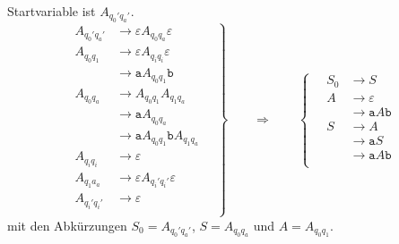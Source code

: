 \begin{loesung}
Startvariable ist $A_{q_0'q_a'}$.
\[
\left.
\begin{aligned}
A_{q_0'q_a'} & \to \varepsilon A_{q_0q_a}\varepsilon  \\
A_{q_0q_1}   & \to \varepsilon A_{q_iq_i}\varepsilon  \\
             & \to \texttt{a} A_{q_0q_1} \texttt{b} \\
A_{q_0q_a}   & \to A_{q_0q_1}A_{q_1q_a} \\
             & \to \texttt{a} A_{q_0q_a} \\
             & \to \texttt{a} A_{q_0q_1} \texttt{b} A_{q_1q_a} \\
A_{q_iq_i}   & \to \varepsilon \\
A_{q_1a_a}   & \to \varepsilon A_{q_i'q_i'}\varepsilon  \\
A_{q_i'q_i'} & \to \varepsilon \\
\end{aligned}
\quad
\right\}
\qquad\Rightarrow\qquad
\left\{
\quad
\begin{aligned}
S_0 & \to S \\
A   & \to \varepsilon \\
    & \to \texttt{a} A \texttt{b} \\
S   & \to A \\
    & \to \texttt{a} S  \\
    & \to \texttt{a} A \texttt{b} \\
\end{aligned}
\right.
\]
mit den Abkürzungen $S_0=A_{q_0'q_a'}$, $S=A_{q_0q_a}$ und $A=A_{q_0q_1}$.
\end{loesung}



